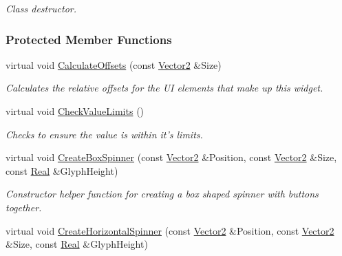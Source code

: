 \begin{DoxyCompactItemize}
\begin{DoxyCompactList}\small\item\em Class destructor. \item\end{DoxyCompactList}\end{DoxyCompactItemize}
\subsubsection*{Protected Member Functions}
\begin{DoxyCompactItemize}
\item 
\hypertarget{classphys_1_1UI_1_1Spinner_abbbdba70d318c15564e120136d472ae9}{
virtual void \hyperlink{classphys_1_1UI_1_1Spinner_abbbdba70d318c15564e120136d472ae9}{CalculateOffsets} (const \hyperlink{classphys_1_1Vector2}{Vector2} \&Size)}
\label{classphys_1_1UI_1_1Spinner_abbbdba70d318c15564e120136d472ae9}

\begin{DoxyCompactList}\small\item\em Calculates the relative offsets for the UI elements that make up this widget. \item\end{DoxyCompactList}\item 
\hypertarget{classphys_1_1UI_1_1Spinner_aa39b1f3c2b0ac1bfe6824f6423915918}{
virtual void \hyperlink{classphys_1_1UI_1_1Spinner_aa39b1f3c2b0ac1bfe6824f6423915918}{CheckValueLimits} ()}
\label{classphys_1_1UI_1_1Spinner_aa39b1f3c2b0ac1bfe6824f6423915918}

\begin{DoxyCompactList}\small\item\em Checks to ensure the value is within it's limits. \item\end{DoxyCompactList}\item 
\hypertarget{classphys_1_1UI_1_1Spinner_aeca447d00d7165acb9f6f4cd253607e5}{
virtual void \hyperlink{classphys_1_1UI_1_1Spinner_aeca447d00d7165acb9f6f4cd253607e5}{CreateBoxSpinner} (const \hyperlink{classphys_1_1Vector2}{Vector2} \&Position, const \hyperlink{classphys_1_1Vector2}{Vector2} \&Size, const \hyperlink{namespacephys_af7eb897198d265b8e868f45240230d5f}{Real} \&GlyphHeight)}
\label{classphys_1_1UI_1_1Spinner_aeca447d00d7165acb9f6f4cd253607e5}

\begin{DoxyCompactList}\small\item\em Constructor helper function for creating a box shaped spinner with buttons together. \item\end{DoxyCompactList}\item 
\hypertarget{classphys_1_1UI_1_1Spinner_a74fd8b5185cae46beef77599fe6ef44f}{
virtual void \hyperlink{classphys_1_1UI_1_1Spinner_a74fd8b5185cae46beef77599fe6ef44f}{CreateHorizontalSpinner} (const \hyperlink{classphys_1_1Vector2}{Vector2} \&Position, const \hyperlink{classphys_1_1Vector2}{Vector2} \&Size, const \hyperlink{namespacephys_af7eb897198d265b8e868f45240230d5f}{Real} \&GlyphHeight)}
\label{classphys_1_1UI_1_1Spinner_a74fd8b5185cae46beef77599fe6ef44f}


\end{DoxyCompactItemize}
